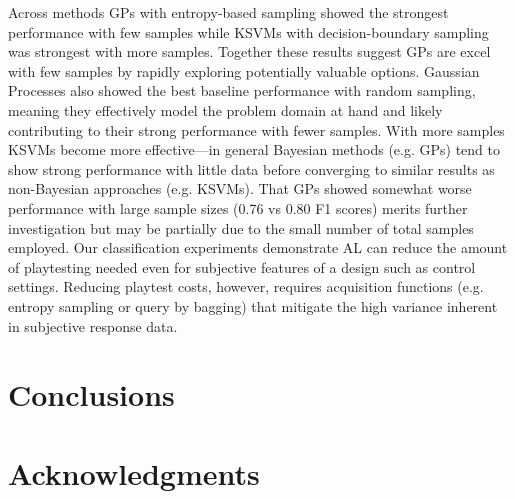 \documentclass{sig-alternate}
\begin{document}
Across methods GPs with entropy-based sampling showed the strongest performance with few samples while KSVMs with decision-boundary sampling was strongest with more samples.
Together these results suggest GPs are excel with few samples by rapidly exploring potentially valuable options.
Gaussian Processes also showed the best baseline performance with random sampling, meaning they effectively model the problem domain at hand and likely contributing to their strong performance with fewer samples.
With more samples KSVMs become more effective---in general Bayesian methods (e.g. GPs) tend to show strong performance with little data before converging to similar results as non-Bayesian approaches (e.g. KSVMs).
That GPs showed somewhat worse performance with large sample sizes (0.76 vs 0.80 F1 scores) merits further investigation but may be partially due to the small number of total samples employed.
%
Our classification experiments demonstrate AL can reduce the amount of playtesting needed even for subjective features of a design such as control settings.
Reducing playtest costs, however, requires acquisition functions (e.g. entropy sampling or query by bagging) that mitigate the high variance inherent in subjective response data.







\section{Conclusions}









\section{Acknowledgments}



\end{document}
